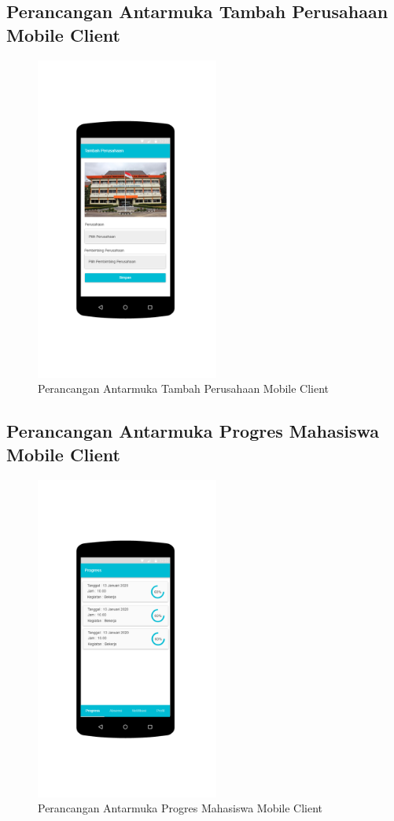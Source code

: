 \subsection{Perancangan Antarmuka Tambah Perusahaan Mobile Client }
	\begin{figure}[H]
		\includegraphics[width=6cm]{figures/diagram/image122.png}
		\centering
		\caption{Perancangan Antarmuka Tambah Perusahaan Mobile Client}
	\end{figure}
\subsection{Perancangan Antarmuka Progres Mahasiswa Mobile Client }
	\begin{figure}[H]
		\includegraphics[width=6cm]{figures/diagram/image123.png}
		\centering
		\caption{Perancangan Antarmuka Progres Mahasiswa Mobile Client}
	\end{figure}
